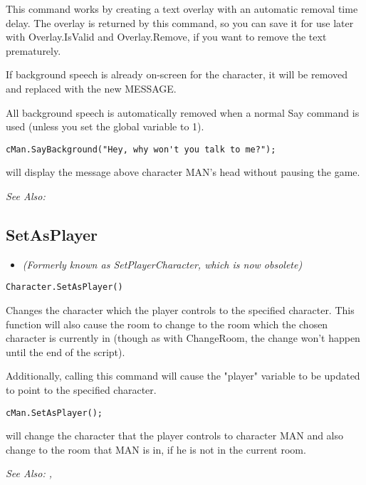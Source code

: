 This command works by creating a text overlay with an automatic removal time
delay. The overlay is returned by this command, so you can save it for
use later with Overlay.IsValid and Overlay.Remove, if you want to remove the
text prematurely.

If background speech is already on-screen for the character, it will be removed and
replaced with the new MESSAGE.

All background speech is automatically removed when a normal Say command
is used (unless you set the global variable  to 1).

\begin{verbatim}
cMan.SayBackground("Hey, why won't you talk to me?");
\end{verbatim}
will display the message above character MAN's head without pausing the game.

\it{See Also:} 


\subsection{SetAsPlayer}\label{Character.SetAsPlayer}%

\begin{itemize}
\item \it{(Formerly known as SetPlayerCharacter, which is now obsolete)}
\end{itemize}

\begin{verbatim}
Character.SetAsPlayer()
\end{verbatim}
Changes the character which the player controls to the specified character.
This function will also cause the room to change to the room which the
chosen character is currently in (though as with ChangeRoom, the change won't
happen until the end of the script).

Additionally, calling this command will cause the "player" variable to be
updated to point to the specified character.

\begin{verbatim}
cMan.SetAsPlayer();
\end{verbatim}
will change the character that the player controls to character MAN and also change to the room
that MAN is in, if he is not in the current room.

\it{See Also:} ,


